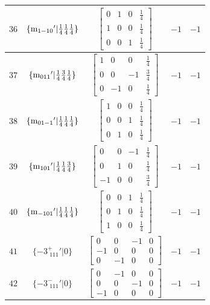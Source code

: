 \documentclass[fleqn,8pt]{jsarticle}
\begin{document}
\begin{longtable}{ccccc}
$ 36 $ & $ \{{\rm m}_{1-10}{}'|\frac{1}{4} \frac{1}{4} \frac{1}{4}\} $ & $ \begin{bmatrix} 0 & 1 & 0 & \frac{1}{4} \\ 1 & 0 & 0 & \frac{1}{4} \\ 0 & 0 & 1 & \frac{1}{4} \end{bmatrix} $ & $ -1 $ & $ -1 $ \\ \hline
$ 37 $ & $ \{{\rm m}_{011}{}'|\frac{1}{4} \frac{3}{4} \frac{1}{4}\} $ & $ \begin{bmatrix} 1 & 0 & 0 & \frac{1}{4} \\ 0 & 0 & -1 & \frac{3}{4} \\ 0 & -1 & 0 & \frac{1}{4} \end{bmatrix} $ & $ -1 $ & $ -1 $ \\ \hline
$ 38 $ & $ \{{\rm m}_{01-1}{}'|\frac{1}{4} \frac{1}{4} \frac{1}{4}\} $ & $ \begin{bmatrix} 1 & 0 & 0 & \frac{1}{4} \\ 0 & 0 & 1 & \frac{1}{4} \\ 0 & 1 & 0 & \frac{1}{4} \end{bmatrix} $ & $ -1 $ & $ -1 $ \\ \hline
$ 39 $ & $ \{{\rm m}_{101}{}'|\frac{1}{4} \frac{1}{4} \frac{3}{4}\} $ & $ \begin{bmatrix} 0 & 0 & -1 & \frac{1}{4} \\ 0 & 1 & 0 & \frac{1}{4} \\ -1 & 0 & 0 & \frac{3}{4} \end{bmatrix} $ & $ -1 $ & $ -1 $ \\ \hline
$ 40 $ & $ \{{\rm m}_{-101}{}'|\frac{1}{4} \frac{1}{4} \frac{1}{4}\} $ & $ \begin{bmatrix} 0 & 0 & 1 & \frac{1}{4} \\ 0 & 1 & 0 & \frac{1}{4} \\ 1 & 0 & 0 & \frac{1}{4} \end{bmatrix} $ & $ -1 $ & $ -1 $ \\ \hline
$ 41 $ & $ \{-3^{+}_{\,\,111}{}'|0\} $ & $ \begin{bmatrix} 0 & 0 & -1 & 0 \\ -1 & 0 & 0 & 0 \\ 0 & -1 & 0 & 0 \end{bmatrix} $ & $ -1 $ & $ -1 $ \\ \hline
$ 42 $ & $ \{-3^{-}_{\,\,111}{}'|0\} $ & $ \begin{bmatrix} 0 & -1 & 0 & 0 \\ 0 & 0 & -1 & 0 \\ -1 & 0 & 0 & 0 \end{bmatrix} $ & $ -1 $ & $ -1 $ \\ \hline

\end{longtable}
\end{document}
